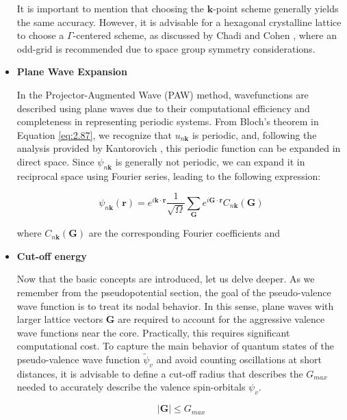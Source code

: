 \begin{itemize}
It is important to mention that choosing the \(\mathbf{k}\)-point scheme generally yields the same accuracy. However, it is advisable for a hexagonal crystalline lattice to choose a \(\Gamma\)-centered scheme, as discussed by Chadi and Cohen \cite{chadi1973special}, where an odd-grid is recommended due to space group symmetry considerations.

\item \textbf{Plane Wave Expansion}  

In the Projector-Augmented Wave (PAW) method, wavefunctions are described using plane waves due to their computational efficiency and completeness in representing periodic systems. From Bloch's theorem in Equation \ref{eq:2.87}, we recognize that $u_{n \mathbf{k}}$ is periodic, and, following the analysis provided by Kantorovich \supercite{kantorovich2004}, this periodic function can be expanded in direct space. Since $\psi_{n \mathbf{k}}$ is generally not periodic, we can expand it in reciprocal space using Fourier series, leading to the following expression:  

\begin{equation}  
	\psi_{n \mathbf{k}}(\mathbf{r}) = e^{i \mathbf{k} \cdot \mathbf{r}} \frac{1}{\sqrt{\Omega}} \sum_{\mathbf{G}} e^{i \mathbf{G} \cdot \mathbf{r}} C_{n \mathbf{k}}(\mathbf{G})  
\end{equation}  

where $ C_{n \mathbf{k}}(\mathbf{G}) $ are the corresponding Fourier coefficients and \


\item \textbf{Cut-off energy} \label{cutoff-energy}

Now that the basic concepts are introduced, let us delve deeper. As we remember from the pseudopotential section, the goal of the pseudo-valence wave function is to treat its nodal behavior. In this sense, plane waves with larger lattice vectors \(\mathbf{G}\) are required to account for the aggressive valence wave functions near the core. Practically, this requires significant computational cost. To capture the main behavior of quantum states of the pseudo-valence wave function \(\tilde{\psi}_v\) and avoid counting oscillations at short distances, it is advisable to define a cut-off radius that describes the \(G_{max}\) needed to accurately describe the valence spin-orbitals \(\psi_v\).

\begin{equation}
	|\mathbf{G}| \leq G_{max}
\end{equation}


\end{itemize}
